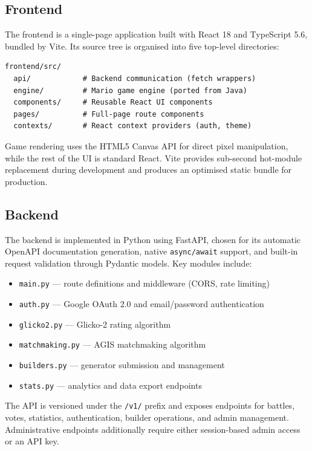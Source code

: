 \documentclass[shortabstract, mgr, english]{iithesis}
\begin{document}
\subsection{Frontend}
\label{subsec:sd-frontend}

The frontend is a single-page application built with React 18 and TypeScript 5.6, bundled
by Vite. Its source tree is organised into five top-level directories:

\begin{lstlisting}
frontend/src/
  api/            # Backend communication (fetch wrappers)
  engine/         # Mario game engine (ported from Java)
  components/     # Reusable React UI components
  pages/          # Full-page route components
  contexts/       # React context providers (auth, theme)
\end{lstlisting}

Game rendering uses the HTML5 Canvas API for direct pixel manipulation, while the rest of
the UI is standard React. Vite provides sub-second hot-module replacement during development
and produces an optimised static bundle for production.

\subsection{Backend}
\label{subsec:sd-backend}

The backend is implemented in Python using FastAPI, chosen for its automatic OpenAPI
documentation generation, native \texttt{async/await} support, and built-in request
validation through Pydantic models. Key modules include:

\begin{itemize}[nosep]
    \item \texttt{main.py} --- route definitions and middleware (CORS, rate limiting)
    \item \texttt{auth.py} --- Google OAuth 2.0 and email/password authentication
    \item \texttt{glicko2.py} --- Glicko-2 rating algorithm
    \item \texttt{matchmaking.py} --- AGIS matchmaking algorithm
    \item \texttt{builders.py} --- generator submission and management
    \item \texttt{stats.py} --- analytics and data export endpoints
\end{itemize}

The API is versioned under the \texttt{/v1/} prefix and exposes endpoints for battles,
votes, statistics, authentication, builder operations, and admin management. Administrative
endpoints additionally require either session-based admin access or an API key.
\end{document}
